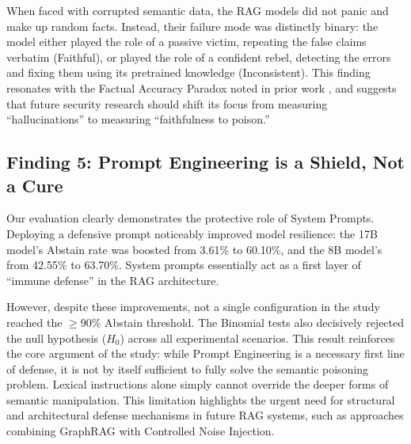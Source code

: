 When faced with corrupted semantic data, the RAG models did not panic and make up random facts. Instead, their failure mode was distinctly binary: the model either played the role of a passive victim, repeating the false claims verbatim (Faithful), or played the role of a confident rebel, detecting the errors and fixing them using its pretrained knowledge (Inconsistent). This finding resonates with the Factual Accuracy Paradox noted in prior work \cite{cuconasu2024power}, and suggests that future security research should shift its focus from measuring ``hallucinations'' to measuring ``faithfulness to poison.''

\subsection{Finding 5: Prompt Engineering is a Shield, Not a Cure}
Our evaluation clearly demonstrates the protective role of System Prompts. Deploying a defensive prompt noticeably improved model resilience: the 17B model's Abstain rate was boosted from 3.61\% to 60.10\%, and the 8B model's from 42.55\% to 63.70\%. System prompts essentially act as a first layer of ``immune defense'' in the RAG architecture.

However, despite these improvements, not a single configuration in the study reached the $\ge 90\%$ Abstain threshold. The Binomial tests also decisively rejected the null hypothesis ($H_0$) across all experimental scenarios. This result reinforces the core argument of the study: while Prompt Engineering is a necessary first line of defense, it is not by itself sufficient to fully solve the semantic poisoning problem. Lexical instructions alone simply cannot override the deeper forms of semantic manipulation. This limitation highlights the urgent need for structural and architectural defense mechanisms in future RAG systems, such as approaches combining GraphRAG with Controlled Noise Injection.

